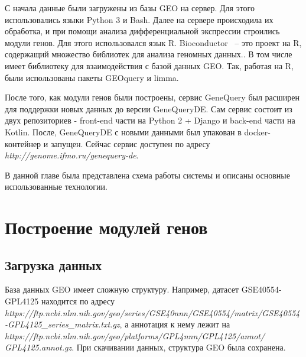 \documentclass[times,specification,annotation]{itmo-student-thesis}
\begin{document}
С начала данные были загружены из базы GEO на сервер. Для этого использовались языки Python 3 и Bash. Далее на сервере происходила их обработка, и при помощи анализа дифференциальной экспрессии строились модули генов. Для этого использовался язык R. Bioconductor ~-- это проект на R, содержащий множество библиотек для анализа геномных данных.\cite{Bioconductor}. В том числе имеет библиотеку для взаимодействия с базой данных GEO. Так, работая на R, были использованы пакеты GEOquery и limma. 

После того, как модули генов были построены, сервис GeneQuery был расширен для поддержки новых данных до версии GeneQueryDE. Сам сервис состоит из двух репозиториев - front-end части на Python 2 + Django и back-end части на Kotlin. После, GeneQueryDE с новыми данными был упакован в docker-контейнер и запущен. Сейчас сервис доступен по адресу \textit{http://genome.ifmo.ru/genequery-de}.

\chapterconclusion

В данной главе была представлена схема работы системы и описаны основные использованные технологии.

\chapter{Построение модулей генов}

\section{Загрузка данных}

База данных GEO имеет сложную структуру. Например, датасет GSE40554-GPL4125 находится по адресу \textit{https://ftp.ncbi.nlm.nih.gov/geo/series/GSE40nnn/GSE40554/matrix/GSE40554-GPL4125\_series\_matrix.txt.gz}, а аннотация к нему лежит на \textit{https://ftp.ncbi.nlm.nih.gov/geo/platforms/GPL4nnn/GPL4125/annot/} \textit{GPL4125.annot.gz}. При скачивании данных, структура GEO была сохранена. 
\end{document}
